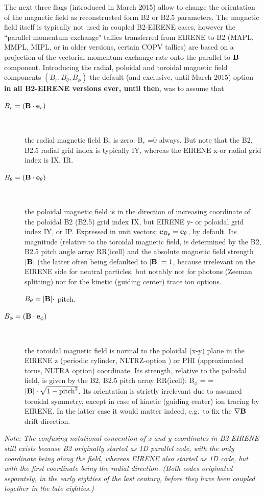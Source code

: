 The next three flags (introduced in March 2015) allow to change the orientation
of the magnetic field as reconstructed form B2 or B2.5 parameters.
The magnetic field itself is typically not used in coupled B2-EIRENE cases,
however the ``parallel momentum exchange" tallies transferred from EIRENE to B2
(MAPL, MMPL, MIPL, or in older versions, certain COPV tallies) are based on a
projection of the vectorial momentum exchange rate onto the parallel to $\mathbf{B}$
component.
Introducing the radial, poloidal and toroidal magnetic field components
$(B_r,B_\theta,B_\phi)$ the default (and exclusive, until March 2015) option
\textbf{in all B2-EIRENE versions ever, until then}, was to assume that
\begin{description}
  \item[$B_r = (\mathbf{B} \cdot \mathbf{e}_r)$] ~ 

        the radial magnetic field B$_r$ is zero: B$_r$ =0 always.
        But note that the B2, B2.5 radial grid index is typically IY, whereas the
        EIRENE x-or radial grid index is IX, IR.

  \item[$B_\theta = (\mathbf{B} \cdot \mathbf{e}_\theta)$] ~ 

        the poloidal magnetic field is in the direction of increasing coordinate of the
        poloidal B2 (B2.5) grid index IX, but EIRENE y- or poloidal grid index IY, or
        IP.
        Expressed in unit vectors: $\mathbf{e}_{B_\theta} = \mathbf{e}_\theta$, by default.
        Its magnitude (relative to the toroidal magnetic field, is determined by the
        B2, B2.5 pitch angle array RR(icell) and the absolute magnetic field strength
        $|\mathbf{B}|$ (the latter often being defaulted to $|\mathbf{B}|=1$, because irrelevant on
        the EIRENE side for neutral particles, but notably not for photons (Zeeman
        splitting) nor for the kinetic (guiding center) trace ion options.

        $B_\theta = |\mathbf{B}| \cdot $ pitch.
  \item[$B_\phi = (\mathbf{B} \cdot \mathbf{e}_\phi)$] ~ 

        the toroidal magnetic field is normal to the poloidal (x-y) plane in the EIRENE
        z (periodic cylinder, NLTRZ-option ) or PHI (approximated torus, NLTRA option)
        coordinate.
        Its strength, relative to the poloidal field, is given by the B2, B2.5 pitch
        array RR(icell):
        B$_\phi$ = = $|\mathbf{B}| \cdot \sqrt{1-\mbox{pitch}^2}$.
        Its orientation is strictly irrelevant due to assumed toroidal symmetry, except
        in case of kinetic (guiding center) ion tracing by EIRENE.
        In the latter case it would matter indeed, e.g.\ to fix the $\nabla \mathbf{B}$ drift
        direction.
\end{description}
\emph{Note: The confusing notational convention of x and y coordinates in 
  B2-EIRENE still exists because B2 originally started as 1D parallel code, with 
  the only coordinate being along the field, whereas EIRENE also started as 1D 
  code, but with the first coordinate being the radial direction. 
  (Both codes originated separately, in the early eighties of the last century, 
  before they have been coupled together in the late eighties.)}

